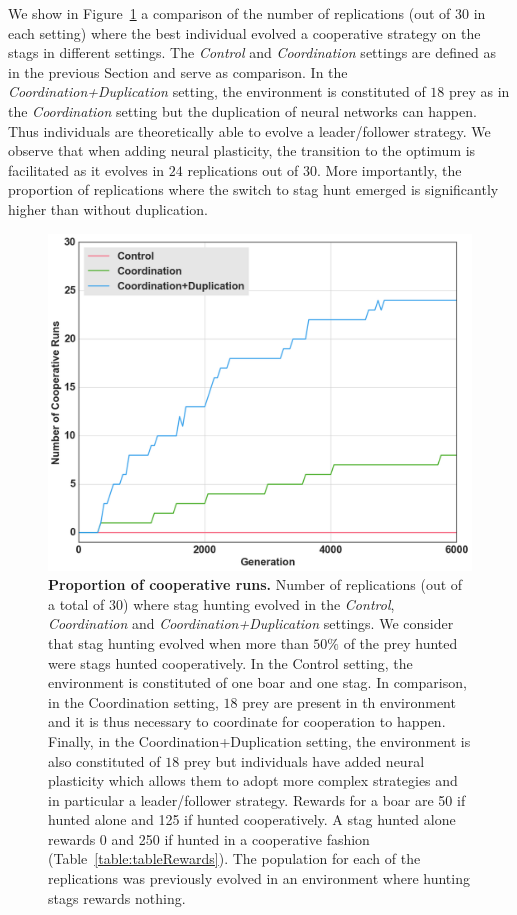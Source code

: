     We show in Figure~\ref{fig:figRecyclingLeadership} a comparison of the number of replications (out of $30$ in each setting) where the best individual evolved a cooperative strategy on the stags in different settings. The \emph{Control} and \emph{Coordination} settings are defined as in the previous Section and serve as comparison. In the \emph{Coordination+Duplication} setting, the environment is constituted of $18$ prey as in the \emph{Coordination} setting but the duplication of neural networks can happen. Thus individuals are theoretically able to evolve a leader/follower strategy. We observe that when adding neural plasticity, the transition to the optimum is facilitated as it evolves in $24$ replications out of $30$. More importantly, the proportion of replications where the switch to stag hunt emerged is significantly higher than without duplication. 


    \begin{figure}[h]
      \centering
        \includegraphics[width=0.7\linewidth]{fig/ArticleBio2/Fig4.png}
        \caption{\textbf{Proportion of cooperative runs.}
        Number of replications (out of a total of $30$) where stag hunting evolved in the \emph{Control}, \emph{Coordination} and \emph{Coordination+Duplication} settings. We consider that stag hunting evolved when more than $50\%$ of the prey hunted were stags hunted cooperatively. In the Control setting, the environment is constituted of one boar and one stag. In comparison, in the Coordination setting, $18$ prey are present in th environment and it is thus necessary to coordinate for cooperation to happen. Finally, in the Coordination+Duplication setting, the environment is also constituted of $18$ prey but individuals have added neural plasticity which allows them to adopt more complex strategies and in particular a leader/follower strategy. Rewards for a boar are 50 if hunted alone and 125 if hunted cooperatively. A stag hunted alone rewards 0 and 250 if hunted in a cooperative fashion (Table~\ref{table:tableRewards}). The population for each of the replications was previously evolved in an environment where hunting stags rewards nothing.}
      \label{fig:figRecyclingLeadership}
    \end{figure}

